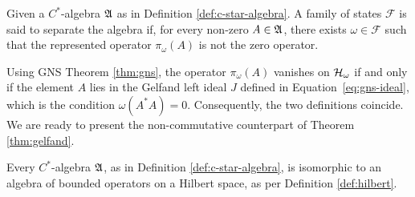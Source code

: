 \begin{definition}
	Given a $C^*$-algebra $\mathfrak{A}$ as in Definition \ref{def:c-star-algebra}. A family of states $\mathcal{F}$ is said to separate the algebra if, for every non-zero $A \in \mathfrak{A}$, there exists $\omega \in \mathcal{F}$ such that the represented operator $\pi_\omega(A)$ is not the zero operator.
\end{definition}

Using GNS Theorem \ref{thm:gns}, the operator $\pi_\omega(A)$ vanishes on $\H_\omega$ if and only if the element $A$ lies in the Gelfand left ideal $J$ defined in Equation~\eqref{eq:gns-ideal}, which is the condition $\omega(A^*A) = 0$. Consequently, the two definitions coincide. We are ready to present the non-commutative counterpart of Theorem \ref{thm:gelfand}.

\begin{theorem}
	\label{thm:gelfand-naimark}
	Every $C^*$-algebra $\mathfrak{A}$, as in Definition \ref{def:c-star-algebra}, is isomorphic to an algebra of bounded operators on a Hilbert space, as per Definition \ref{def:hilbert}.
\end{theorem}

